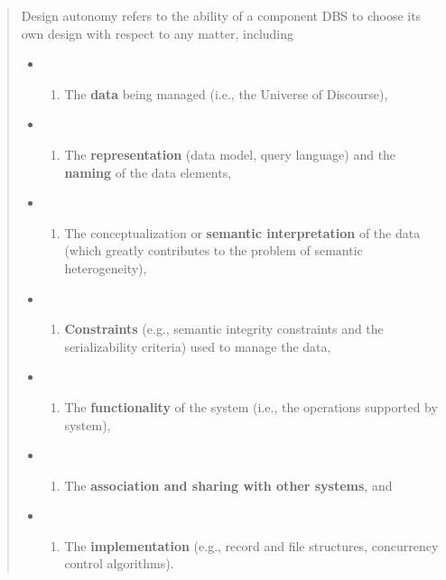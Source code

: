 \begin{quote}
Design autonomy refers to the ability of a component DBS to choose its
own design with respect to any matter, including

\begin{itemize}
\item
  \begin{enumerate}
  \def\labelenumi{(\alph{enumi})}
  
  \item
    The \textbf{data} being managed (i.e., the Universe of Discourse),
  \end{enumerate}
\item
  \begin{enumerate}
  \def\labelenumi{(\alph{enumi})}
  \setcounter{enumi}{1}
  
  \item
    The \textbf{representation} (data model, query language) and the
    \textbf{naming} of the data elements,
  \end{enumerate}
\item
  \begin{enumerate}
  \def\labelenumi{(\alph{enumi})}
  \setcounter{enumi}{2}
  
  \item
    The conceptualization or \textbf{semantic interpretation} of the
    data (which greatly contributes to the problem of semantic
    heterogeneity),
  \end{enumerate}
\item
  \begin{enumerate}
  \def\labelenumi{(\alph{enumi})}
  \setcounter{enumi}{3}
  
  \item
    \textbf{Constraints} (e.g., semantic integrity constraints and the
    serializability criteria) used to manage the data,
  \end{enumerate}
\item
  \begin{enumerate}
  \def\labelenumi{(\alph{enumi})}
  \setcounter{enumi}{4}
  
  \item
    The \textbf{functionality} of the system (i.e., the operations
    supported by system),
  \end{enumerate}
\item
  \begin{enumerate}
  \def\labelenumi{(\alph{enumi})}
  \setcounter{enumi}{5}
  
  \item
    The \textbf{association and sharing with other systems}, and
  \end{enumerate}
\item
  \begin{enumerate}
  \def\labelenumi{(\alph{enumi})}
  \setcounter{enumi}{6}
  
  \item
    The \textbf{implementation} (e.g., record and file structures,
    concurrency control algorithms).
  \end{enumerate}
\end{itemize}
\end{quote}

